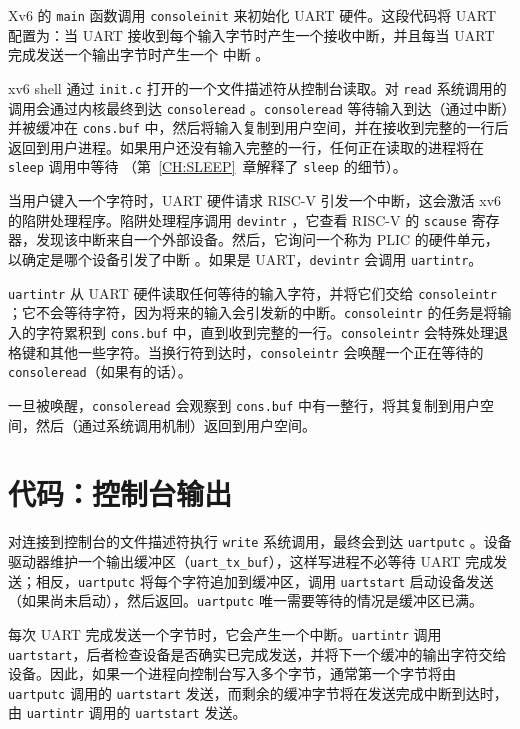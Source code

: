 Xv6 的 {\tt main} 函数调用 {\tt consoleinit}  来初始化 UART 硬件。这段代码将 UART 配置为：当 UART 接收到每个输入字节时产生一个接收中断，并且每当 UART 完成发送一个输出字节时产生一个  中断 。

xv6 shell 通过 {\tt init.c}  打开的一个文件描述符从控制台读取。对 {\tt read} 系统调用的调用会通过内核最终到达 {\tt consoleread} 。{\tt consoleread} 等待输入到达（通过中断）并被缓冲在 {\tt cons.buf} 中，然后将输入复制到用户空间，并在接收到完整的一行后返回到用户进程。如果用户还没有输入完整的一行，任何正在读取的进程将在 {\tt sleep} 调用中等待 （第~\ref{CH:SLEEP}~章解释了 {\tt sleep} 的细节）。

当用户键入一个字符时，UART 硬件请求 RISC-V 引发一个中断，这会激活 xv6 的陷阱处理程序。陷阱处理程序调用 {\tt devintr} ，它查看 RISC-V 的 {\tt scause} 寄存器，发现该中断来自一个外部设备。然后，它询问一个称为 PLIC \cite{riscv:priv} 的硬件单元，以确定是哪个设备引发了中断 。如果是 UART，{\tt devintr} 会调用 {\tt uartintr}。

{\tt uartintr} 
从 UART 硬件读取任何等待的输入字符，并将它们交给 {\tt consoleintr} ；它不会等待字符，因为将来的输入会引发新的中断。{\tt consoleintr} 的任务是将输入的字符累积到 {\tt cons.buf} 中，直到收到完整的一行。{\tt consoleintr} 会特殊处理退格键和其他一些字符。当换行符到达时，{\tt consoleintr} 会唤醒一个正在等待的 {\tt consoleread}（如果有的话）。

一旦被唤醒，{\tt consoleread} 会观察到 {\tt cons.buf} 中有一整行，将其复制到用户空间，然后（通过系统调用机制）返回到用户空间。

\section{代码：控制台输出}

对连接到控制台的文件描述符执行 {\tt write} 系统调用，最终会到达 {\tt uartputc} 。设备驱动器维护一个输出缓冲区（{\tt uart\_tx\_buf}），这样写进程不必等待 UART 完成发送；相反，{\tt uartputc} 将每个字符追加到缓冲区，调用 {\tt uartstart} 启动设备发送（如果尚未启动），然后返回。{\tt uartputc} 唯一需要等待的情况是缓冲区已满。

每次 UART 完成发送一个字节时，它会产生一个中断。{\tt uartintr} 调用 {\tt uartstart}，后者检查设备是否确实已完成发送，并将下一个缓冲的输出字符交给设备。因此，如果一个进程向控制台写入多个字节，通常第一个字节将由 {\tt uartputc} 调用的 {\tt uartstart} 发送，而剩余的缓冲字节将在发送完成中断到达时，由 {\tt uartintr} 调用的 {\tt uartstart} 发送。

